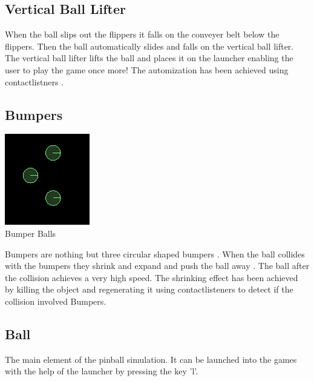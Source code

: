 \documentclass[11pt]{article}
\begin{document}
\subsection{Vertical Ball Lifter}
When the ball slips out the flippers it falls on the conveyer belt below the flippers. Then the ball automatically slides and falls on the vertical ball lifter. The vertical ball lifter lifts the ball and places it on the launcher enabling the user to play the game once more! The automization has been achieved using contactlistners .


\subsection{Bumpers}
\begin{center}
\includegraphics[scale=0.5]{../plots/bumperballs.png}\\
Bumper Balls
\end{center}
Bumpers are nothing but three circular shaped bumpers . When the ball collides with the bumpers they shrink and expand and push the ball away . The ball after the collision achieves a very high speed. The shrinking effect has been achieved by killing the object and regenerating it using contactlisteners to detect if the collision involved Bumpers.

\subsection{Ball}
The main element of the pinball simulation. It can be launched into the games with the help of the launcher by pressing the key 'l'.
\end{document}
